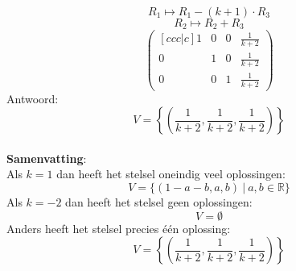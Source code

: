 \documentclass[lineaire_algebra_oplossingen.tex]{subfiles}
\begin{document}
\[ R_1 \longmapsto R_1 - (k+1)\cdot R_3\]
\[ R_2 \longmapsto R_2 + R_3\]
\[
\begin{pmatrix}[ccc|c]
1 &  0 &  0 & \frac{1}{k+2}\\
0 &  1 &  0 & \frac{1}{k+2}\\
0 &  0 &  1 & \frac{1}{k+2}
\end{pmatrix}
\]
Antwoord:
\[
V=\left\{\left( \frac{1}{k+2},\frac{1}{k+2},\frac{1}{k+2} \right)\right\}
\]\\
\textbf{Samenvatting}:\\
Als $k=1$ dan heeft het stelsel oneindig veel oplossingen:
\[
V=\{ (1-a-b,a,b)\ |\ a,b \in \mathbb{R}\}
\]
Als $k=-2$ dan heeft het stelsel geen oplossingen:
\[
V=\emptyset
\]
Anders heeft het stelsel precies \'e\'en oplossing:
\[
V=\left\{\left( \frac{1}{k+2},\frac{1}{k+2},\frac{1}{k+2} \right)\right\}
\]
\end{document}
